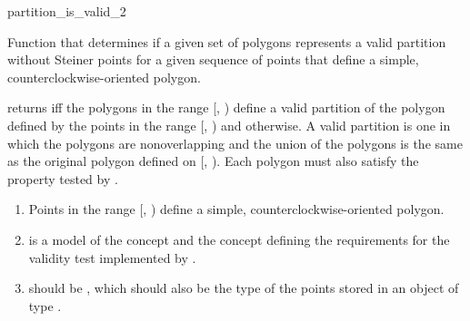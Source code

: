 \renewcommand\ccRefPageBegin{\ccParDims\cgalColumnLayout\begin{ccAdvanced}}
\renewcommand\ccRefPageEnd{\ccParDims\cgalColumnLayout\end{ccAdvanced}}
\begin{ccRefFunction}{partition_is_valid_2}

\ccDefinition

Function that determines if a given set of polygons represents
a valid partition without Steiner points for a given sequence of points that 
define a simple, counterclockwise-oriented polygon.  


{
returns  iff the polygons in the range [, 
) define a valid partition of the polygon defined by the 
points in the range [, ) and 
 otherwise.  A valid partition is one in
which the polygons are nonoverlapping and the union of the polygons is the 
same as the original polygon defined on [, ).
Each polygon must also satisfy the property 
tested by . 
}

\begin{enumerate}
    \item Points in the range [, ) define
          a simple, counterclockwise-oriented polygon.
    \item {} is a model of the concept 
           and the
          concept defining the requirements for the validity test 
          implemented by .
    \item {} should be ,
          which should also be the type of the points stored in an object
          of type .
\end{enumerate}


\end{ccRefFunction}
